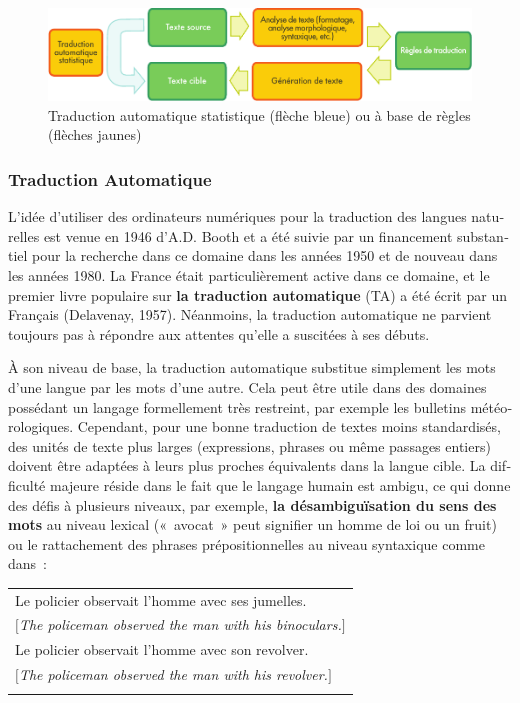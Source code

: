 \begin{french}
\begin{multicols}{2}
\begin{figure}[t]
\begin{center}
 \includegraphics[width=\textwidth]{../_media/french/machine_translation}
\caption{Traduction automatique statistique (flèche bleue) ou à base de règles (flèches jaunes)}
\label{fig:mtarchi}
\end{center}
\end{figure}

\subsubsection{Traduction Automatique}
L'idée d'utiliser des ordinateurs numériques pour la traduction des
langues naturelles est venue en 1946 d'A.D. Booth et a été suivie par
un financement substantiel pour la recherche dans ce domaine dans les
années 1950 et de nouveau dans les années 1980. La France était
particulièrement active dans ce domaine, et le premier livre populaire
sur {\bf la traduction automatique} (TA) a été écrit par un Français
(Delavenay, 1957). Néanmoins, la traduction automatique ne
parvient toujours pas à répondre aux attentes qu'elle a suscitées à
ses débuts.

À son niveau de base, la traduction automatique substitue simplement les mots d'une langue
par les mots d'une autre. Cela peut être utile dans des domaines
possédant un langage formellement très restreint, par exemple les
bulletins météorologiques. Cependant, pour une bonne traduction de
textes moins standardisés, des unités de texte plus larges
(expressions, phrases ou même passages entiers) doivent être adaptées à
leurs plus proches équivalents dans la langue cible. La difficulté
majeure réside dans le fait que le langage humain est ambigu, ce qui
donne des défis à plusieurs niveaux, par exemple, {\bf la
  désambiguïsation du sens des mots} au niveau lexical («~avocat~»
peut signifier un homme de loi ou un fruit) ou le rattachement des phrases prépositionnelles au niveau syntaxique comme dans~:

\begin{tabular}{l}
\\
Le policier observait l'homme avec ses jumelles.\\
$[${\em The policeman observed the man with his binoculars.}$]$\\
Le policier observait l'homme avec son revolver.\\
$[${\em The policeman observed the man with his revolver.}$]$\\
\\
\end{tabular}


\end{multicols}
\end{french}
